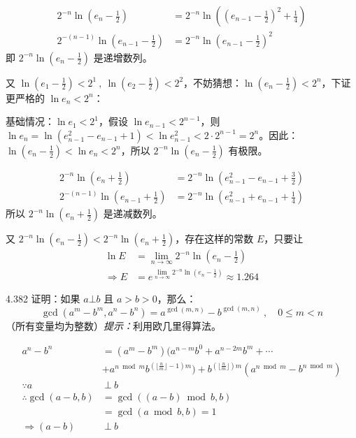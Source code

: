 \begin{align*}
  2^{-n} \ln{(e_n - \frac{1}{2})} & = 2^{-n} \ln{((e_{n-1} - \frac{1}{2})^2 + \frac{1}{4})} \\
  2^{-(n-1)} \ln{(e_{n-1} - \frac{1}{2})} & = 2^{-n} \ln{(e_{n-1} - \frac{1}{2})^2}
\end{align*}
即 \( 2^{-n} \ln{(e_n - \frac{1}{2})} \) 是递增数列。

又 \( \ln{(e_1 - \frac{1}{2})} < 2^1 \ , \ \ln{(e_2 - \frac{1}{2})} < 2^2 \)，不妨猜想：\( \ln{(e_n - \frac{1}{2})} < 2^n \)，下证更严格的 \( \ln{e_n} < 2^n \)：

基础情况：\( \ln{e_1} < 2^1 \)，假设 \( \ln{e_{n-1}} < 2^{n-1} \)，则 \( \ln{e_n} = \ln{(e_{n-1}^2 - e_{n-1} + 1)} < \ln{e_{n-1}^2} < 2 \cdot 2^{n-1} = 2^n \)。因此：\( \ln{(e_n - \frac{1}{2})} < \ln{e_n} < 2^n \)，所以 \( 2^{-n} \ln{(e_n - \frac{1}{2})} \) 有极限。

\begin{align*}
  2^{-n} \ln{(e_n + \frac{1}{2})} &= 2^{-n} \ln{(e_{n-1}^2 - e_{n-1} + \frac{3}{2})} \\
  2^{-(n-1)} \ln{(e_{n-1} + \frac{1}{2})} &= 2^{-n} \ln{(e_{n-1}^2 + e_{n-1} + \frac{1}{4})}
\end{align*}
所以 \( 2^{-n} \ln{(e_n + \frac{1}{2})} \) 是递减数列。

又 \( 2^{-n} \ln{(e_n - \frac{1}{2})} < 2^{-n} \ln{(e_n + \frac{1}{2})} \)，存在这样的常数 \( E \)，只要让
\begin{align*}
  \ln{E} &= \lim_{n \to \infty} 2^{-n} \ln{(e_n - \frac{1}{2})} \\
  \Rightarrow E &= e^{\lim_{n \to \infty} 2^{-n} \ln{(e_n - \frac{1}{2})}} \approx 1.264
\end{align*}

\begin{problem}{4.38}{2}
  证明：如果 \( a \bot b \) 且 \( a > b > 0 \)，那么：
  \[
    \gcd(a^m - b^m , a^n - b^n) = a^{\gcd(m,n)} - b^{\gcd(m,n)} \ , \quad 0 \le m < n
  \]
  （所有变量均为整数）\textit{提示：}利用欧几里得算法。
\end{problem}

\begin{align*}
  a^n - b^n &= (a^m - b^m) (a^{n-m}b^0 + a^{n-2m}b^m + \cdots \\
  &+ a^{n \bmod m} b^{(\lfloor \frac{n}{m} \rfloor - 1)m}) + b^{(\lfloor \frac{n}{m} \rfloor)m} (a^{n \bmod m} - b^{n \bmod m}) \\
  \because a & \ \bot \ b \\
  \therefore \gcd(a-b, b) &= \gcd((a-b) \bmod b, b) \\
  &= \gcd(a \bmod b, b) = 1 \\
  \Rightarrow (a-b) & \ \bot \ b
\end{align*}

